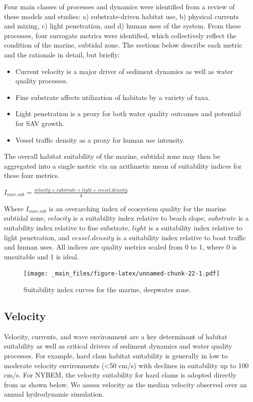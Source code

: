 \documentclass[
]{book}
\begin{document}
Four main classes of processes and dynamics were identified from a review of these models and studies: a) substrate-driven habitat use, b) physical currents and mixing, c) light penetration, and d) human uses of the system. From these processes, four surrogate metrics were identified, which collectively reflect the condition of the marine, subtidal zone. The sections below describe each metric and the rationale in detail, but briefly:

\begin{itemize}
\item
  Current velocity is a major driver of sediment dynamics as well as water quality processes.
\item
  Fine substrate affects utilization of habitats by a variety of taxa.
\item
  Light penetration is a proxy for both water quality outcomes and potential for SAV growth.
\item
  Vessel traffic density as a proxy for human use intensity.
\end{itemize}

The overall habitat suitability of the marine, subtidal zone may then be aggregated into a single metric via an arithmetic mean of suitability indices for these four metrics.

\(I_{mar.sub} = \frac{velocity + substrate + light + vessel.density}{4}\)

Where \(I_{mar.sub}\) is an overarching index of ecosystem quality for the marine subtidal zone, \(velocity\) is a suitability index relative to beach slope, \(substrate\) is a suitability index relative to fine substrate, \(light\) is a suitability index relative to light penetration, and \(vessel.density\) is a suitability index relative to boat traffic and human uses. All indices are quality metrics scaled from 0 to 1, where 0 is unsuitable and 1 is ideal.

\begin{figure}
\centering
\texttt{[image: \_main\_files/figure-latex/unnamed-chunk-22-1.pdf]}
\caption{\label{fig:unnamed-chunk-22}Suitability index curves for the marine, deepwater zone.}
\end{figure}

\hypertarget{velocity}{%
\subsection{Velocity}\label{velocity}}

Velocity, currents, and wave environment are a key determinant of habitat suitability as well as critical drivers of sediment dynamics and water quality processes. For example, hard clam habitat suitability is generally in low to moderate velocity environments (\textless50 cm/s) with declines in suitability up to 100 cm/s. For NYBEM, the velocity suitability for hard clams is adopted directly from \citet{mulholland_habitat_1984-1} as shown below. We assess velocity as the median velocity observed over an annual hydrodynamic simulation.
\end{document}
